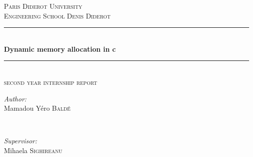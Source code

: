 \documentclass[11pt]{article}
\begin{document}
\begin{titlepage}

\newcommand{\HRule}{\rule{\linewidth}{0.5mm}} %

\center %
 

\textsc{\LARGE Paris Diderot University}\\[1.5cm]
\textsc{\Large Engineering School Denis Diderot}\\[0.5cm] 


\HRule \\[0.4cm]
{ \huge \bfseries Dynamic memory allocation in c}\\[0.4cm] 
\HRule \\[1.5cm]
 
 \textsc{\large second year internship report}\\[1.5cm] 

\begin{minipage}{0.4\textwidth}
\begin{flushleft} \large
\emph{Author:}\\
Mamadou Yéro \textsc{Baldé} %
\end{flushleft}
\end{minipage}
~
\begin{minipage}{0.4\textwidth}
\begin{flushright} \large
\emph{Supervisor:} \\
Mihaela \textsc{Sighireanu} %
\end{flushright}
\end{minipage}\\[2cm]



\end{titlepage}
\end{document}
